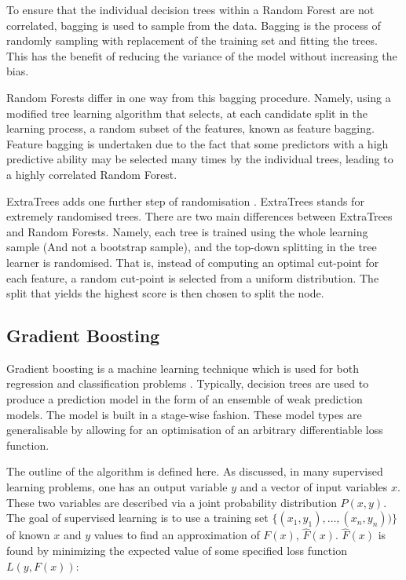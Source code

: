 To ensure that the individual decision trees within a Random Forest are not correlated, bagging is used to sample from the data. Bagging is the process of randomly sampling with replacement of the training set and fitting the trees. This has the benefit of reducing the variance of the model without increasing the bias. 

Random Forests differ in one way from this bagging procedure. Namely, using a modified tree learning algorithm that selects, at each candidate split in the learning process, a random subset of the features, known as feature bagging. Feature bagging is undertaken due to the fact that some predictors with a high predictive ability may be selected many times by the individual trees, leading to a highly correlated Random Forest.

ExtraTrees adds one further step of randomisation \cite{Fike1988}. ExtraTrees stands for extremely randomised trees. There are two main differences between ExtraTrees and Random Forests. Namely, each tree is trained using the whole learning sample (And not a bootstrap sample), and the top-down splitting in the tree learner is randomised. That is, instead of computing an optimal cut-point for each feature, a random cut-point is selected from a uniform distribution. The split that yields the highest score is then chosen to split the node. 


\subsection{Gradient Boosting}


Gradient boosting is a machine learning technique which is used for both regression and classification problems \cite{316}. Typically, decision trees are used to produce a prediction model in the form of an ensemble of weak prediction models. The model is built in a stage-wise fashion. These model types are generalisable by allowing for an optimisation of an arbitrary differentiable loss function.

The outline of the algorithm is defined here. As discussed, in many supervised learning problems, one has an output variable $y$ and a vector of input variables $x$. These two variables are described via a joint probability distribution $P(x,y)$. The goal of supervised learning is to use a training set $\{(x_1,y_1),\ldots,(x_n,y_n))\}$ of known $x$ and $y$ values to find an approximation of $F(x)$, $\hat{F}(x)$. $\hat{F}(x)$ is found by minimizing the expected value of some specified loss function $L(y,F(x))$:

